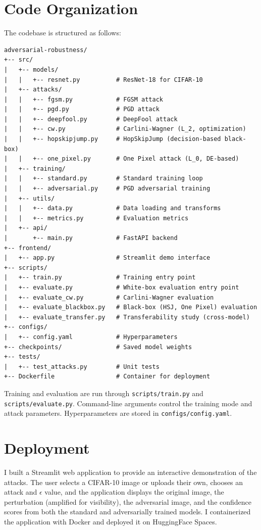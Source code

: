 \section{Code Organization}

The codebase is structured as follows:

\begin{verbatim}
adversarial-robustness/
+-- src/
|   +-- models/
|   |   +-- resnet.py          # ResNet-18 for CIFAR-10
|   +-- attacks/
|   |   +-- fgsm.py            # FGSM attack
|   |   +-- pgd.py             # PGD attack
|   |   +-- deepfool.py        # DeepFool attack
|   |   +-- cw.py              # Carlini-Wagner (L_2, optimization)
|   |   +-- hopskipjump.py     # HopSkipJump (decision-based black-box)
|   |   +-- one_pixel.py       # One Pixel attack (L_0, DE-based)
|   +-- training/
|   |   +-- standard.py        # Standard training loop
|   |   +-- adversarial.py     # PGD adversarial training
|   +-- utils/
|   |   +-- data.py            # Data loading and transforms
|   |   +-- metrics.py         # Evaluation metrics
|   +-- api/
|       +-- main.py            # FastAPI backend
+-- frontend/
|   +-- app.py                 # Streamlit demo interface
+-- scripts/
|   +-- train.py               # Training entry point
|   +-- evaluate.py            # White-box evaluation entry point
|   +-- evaluate_cw.py         # Carlini-Wagner evaluation
|   +-- evaluate_blackbox.py   # Black-box (HSJ, One Pixel) evaluation
|   +-- evaluate_transfer.py   # Transferability study (cross-model)
+-- configs/
|   +-- config.yaml            # Hyperparameters
+-- checkpoints/               # Saved model weights
+-- tests/
|   +-- test_attacks.py        # Unit tests
+-- Dockerfile                 # Container for deployment
\end{verbatim}

Training and evaluation are run through \texttt{scripts/train.py} and \texttt{scripts/\allowbreak evaluate.py}. Command-line arguments control the training mode and attack parameters. Hyperparameters are stored in \texttt{configs/config.yaml}.

\section{Deployment}

I built a Streamlit web application to provide an interactive demonstration of the attacks. The user selects a CIFAR-10 image or uploads their own, chooses an attack and $\epsilon$ value, and the application displays the original image, the perturbation (amplified for visibility), the adversarial image, and the confidence scores from both the standard and adversarially trained models. I containerized the application with Docker and deployed it on HuggingFace Spaces.

